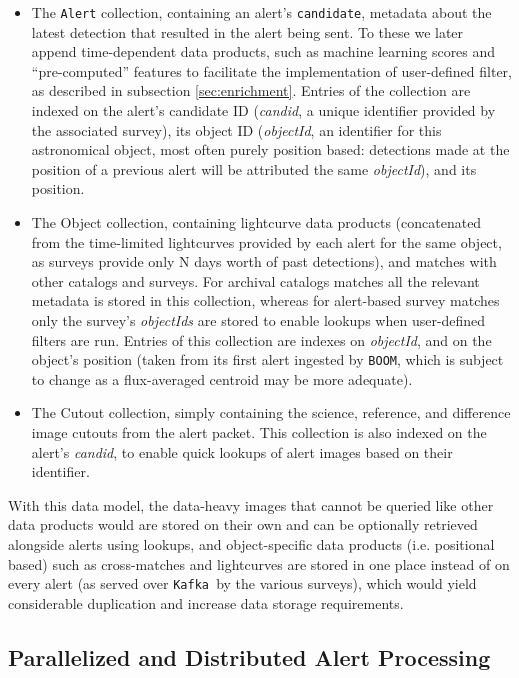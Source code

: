\documentclass[twocolumn]{aastex631}
\newcommand{\kafka}{\texttt{Kafka }}
\begin{document}
\begin{itemize}
    \item The \texttt{Alert} collection, containing an alert's \texttt{candidate}, metadata about the latest detection that resulted in the alert being sent. To these we later append time-dependent data products, such as machine learning scores and ``pre-computed'' features to facilitate the implementation of user-defined filter, as described in subsection \ref{sec:enrichment}. Entries of the collection are indexed on the alert's candidate ID (\textit{candid}, a unique identifier provided by the associated survey), its object ID (\textit{objectId}, an identifier for this astronomical object, most often purely position based: detections made at the position of a previous alert will be attributed the same \textit{objectId}), and its position.
    \item The {Object} collection, containing lightcurve data products (concatenated from the time-limited lightcurves provided by each alert for the same object, as surveys provide only N days worth of past detections), and matches with other catalogs and surveys. For archival catalogs matches all the relevant metadata is stored in this collection, whereas for alert-based survey matches only the survey's \textit{objectIds} are stored to enable lookups when user-defined filters are run. Entries of this collection are indexes on \textit{objectId}, and on the object's position (taken from its first alert ingested by \texttt{BOOM}, which is subject to change as a flux-averaged centroid may be more adequate).
    \item The {Cutout} collection, simply containing the science, reference, and difference image cutouts from the alert packet. This collection is also indexed on the alert's \textit{candid}, to enable quick lookups of alert images based on their identifier.
\end{itemize}

With this data model, the data-heavy images that cannot be queried like other data products would are stored on their own and can be optionally retrieved alongside alerts using lookups, and object-specific data products (i.e. positional based) such as cross-matches and lightcurves are stored in one place instead of on every alert (as served over \kafka by the various surveys), which would yield considerable duplication and increase data storage requirements.

\subsection{Parallelized and Distributed Alert Processing}
\end{document}
